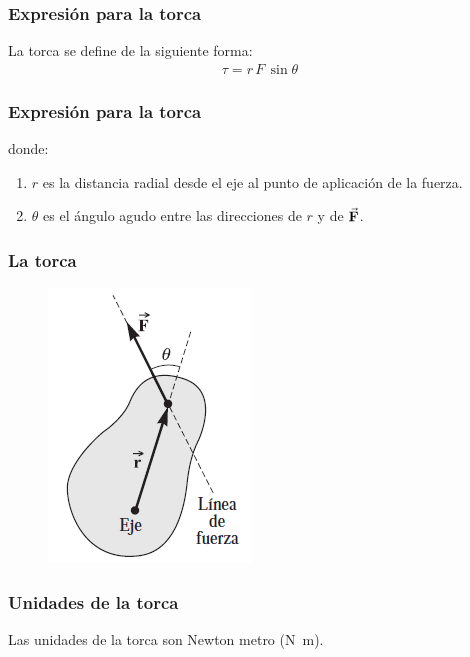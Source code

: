 \documentclass[14pt]{beamer}
\begin{document}
\begin{frame}
\frametitle{Expresión para la torca}
La torca se define de la siguiente forma:
\pause
\begin{align*}
\tau = r \, F \, \sin \theta
\end{align*}
\end{frame}
\begin{frame}
\frametitle{Expresión para la torca}
\vspace*{-0.5em}
donde:
\begin{enumerate}[<+->]
\item $r$ es la distancia radial desde el eje al punto de aplicación de la fuerza.
\item $\theta$ es el ángulo agudo entre las direcciones de $r$ y de $\va{F}$.
\end{enumerate}
\end{frame}
\begin{frame}
\frametitle{La torca}
\begin{figure}
    \centering
    \includegraphics[scale=0.75]{Imagenes/DominaBach_04.png}
\end{figure}
\end{frame}
\begin{frame}
\frametitle{Unidades de la torca}
Las unidades de la torca son Newton metro (\unit{\newton\metre}).
\end{frame}
\end{document}
